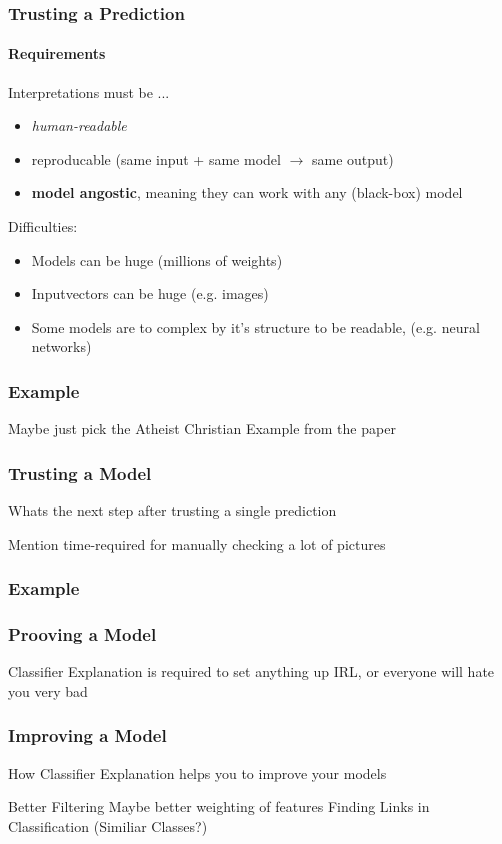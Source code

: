 \begin{frame}
	\frametitle{Trusting a Prediction}
	\framesubtitle{Requirements}
	
	Interpretations must be ...
	\begin{itemize}
		\item \textit{human-readable}
		\item reproducable (same input + same model $\rightarrow$ same output)
		\item \textbf{model angostic}, meaning they can work with any (black-box) model
	\end{itemize}
	
	Difficulties:
	\begin{itemize}
		\item Models can be huge (millions of weights)
		\item Inputvectors can be huge (e.g. images)
		\item Some models are to complex by it's structure to be readable, (e.g. neural networks)
	\end{itemize}
\end{frame}

\begin{frame}
	\frametitle{Example}
	Maybe just pick the Atheist Christian Example from the paper
\end{frame}

\begin{frame}
	\frametitle{Trusting a Model}
	Whats the next step after trusting a single prediction
	
	Mention time-required for manually checking a lot of pictures
\end{frame}
\begin{frame}
	\frametitle{Example}
	
\end{frame}
\begin{frame}
	\frametitle{Prooving a Model}
	Classifier Explanation is required to set anything up IRL, or everyone will hate you very bad
\end{frame}
\begin{frame}
	\frametitle{Improving a Model}
	How Classifier Explanation helps you to improve your models
	
	Better Filtering
	Maybe better weighting of features
	Finding Links in Classification (Similiar Classes?)
\end{frame}